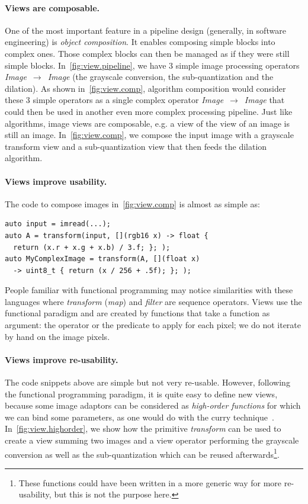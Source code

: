 \paragraph{Views are composable.} One of the most important feature in a pipeline design (generally, in software
engineering) is \emph{object composition}. It enables composing simple blocks into complex ones. Those complex blocks
can then be managed as if they were still simple blocks. In~\cref{fig:view.pipeline}, we have 3 simple image processing
operators \emph{Image}~\(\rightarrow\)~\emph{Image} (the grayscale conversion, the sub-quantization and the dilation).
As shown in~\cref{fig:view.comp}, algorithm composition would consider these 3 simple operators as a single complex
operator \emph{Image}~\(\rightarrow\)~\emph{Image} that could then be used in another even more complex processing
pipeline. Just like algorithms, image views are composable, e.g. a view of the view of an image is still an image.
In~\cref{fig:view.comp}, we compose the input image with a grayscale transform view and a sub-quantization view that
then feeds the dilation algorithm.

\paragraph{Views improve usability.} The code to compose images in~\cref{fig:view.comp} is almost as simple as:

\begin{verbatim}
auto input = imread(...);
auto A = transform(input, [](rgb16 x) -> float {
  return (x.r + x.g + x.b) / 3.f; }; );
auto MyComplexImage = transform(A, [](float x)
  -> uint8_t { return (x / 256 + .5f); }; );
\end{verbatim}

People familiar with functional programming may notice similarities with these languages where \emph{transform}
(\emph{map}) and \emph{filter} are sequence operators. Views use the functional paradigm and are created by functions
that take a function as argument: the operator or the predicate to apply for each pixel; we do not iterate by hand on
the image pixels.

\paragraph{Views improve re-usability.} The code snippets above are simple but not very re-usable. However, following
the functional programming paradigm, it is quite easy to define new views, because some image adaptors can be considered
as \emph{high-order functions} for which we can bind some parameters, as one would do with the curry
technique~\parencite{hanus.1995.curry}. In~\cref{fig:view.highorder}, we show how the primitive \emph{transform} can be
used to create a view summing two images and a view operator performing the grayscale conversion as well as the
sub-quantization which can be reused afterwards\footnote{These functions could have been written in a more generic way
  for more re-usability, but this is not the purpose here.}.

